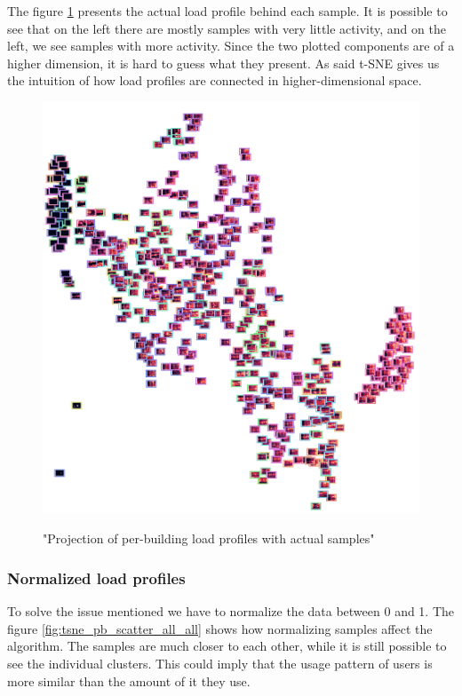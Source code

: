 The figure \ref{fig:tsne_pb_img_scatter_allall} presents the actual load profile behind each sample. 
It is possible to see that on the left there are mostly samples with very little activity,
and on the left, we see samples with more activity.
Since the two plotted components are of a higher dimension, it is hard to guess what they present.
As said t-SNE gives us the intuition of how load profiles are connected in higher-dimensional space.

\begin{figure}[H]
	\centering
	\caption{"Projection of per-building load profiles with actual samples"}
	\includegraphics[width=.9\textwidth]{Figures/TSNE/TSNE_per_building/non_norm/img_scatter_allall.png}
	\label{fig:tsne_pb_img_scatter_allall}
\end{figure}

\subsubsection{Normalized load profiles}

To solve the issue mentioned we have to normalize the data between 0 and 1.
The figure \ref{fig:tsne_pb_scatter_all_all} shows how normalizing samples affect the algorithm.
The samples are much closer to each other, while it is still possible to see the individual clusters.
This could imply that the usage pattern of users is more similar than the amount of it they use.


